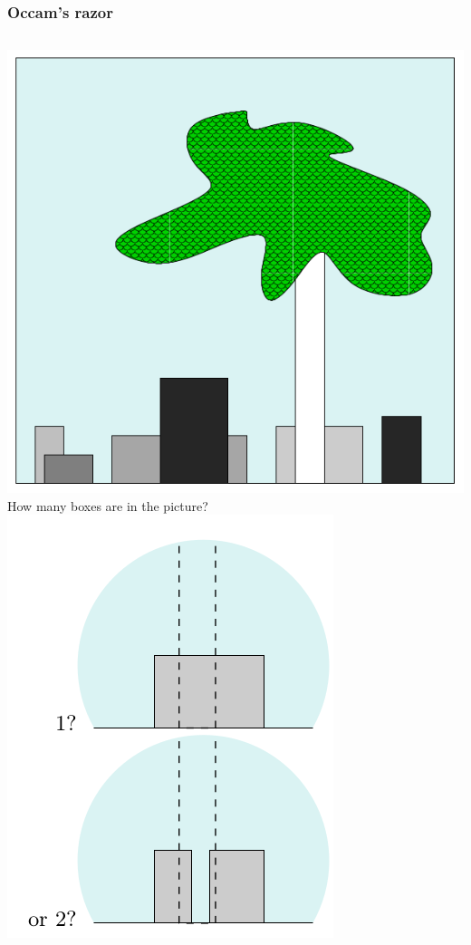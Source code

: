 \documentclass{beamer}
\begin{document}
\begin{frame}
	\frametitle{Occam's razor}
	\begin{columns}
   \includegraphics[width=\textwidth]{e19}\\
	How many boxes are in the picture? 
   \includegraphics[width=\textwidth]{e20}
  \end{columns}

\end{frame}
\end{document}
